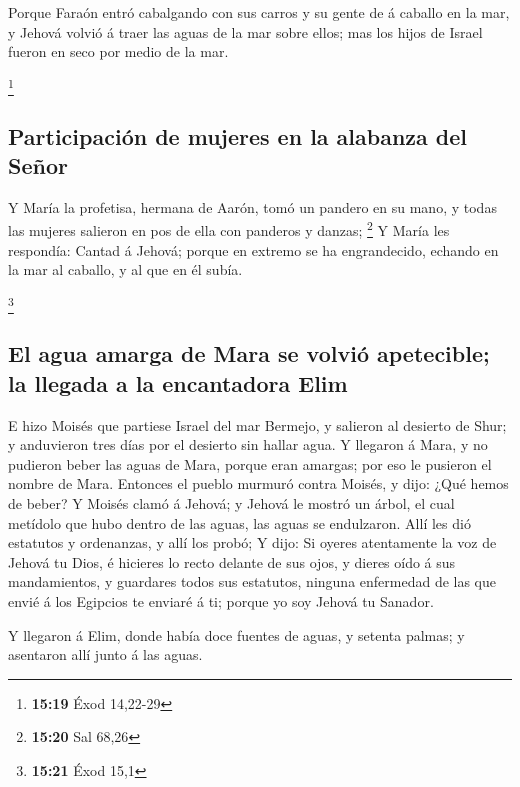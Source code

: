 Porque Faraón entró cabalgando con sus carros y su gente
de á caballo en la mar, y Jehová volvió á traer las aguas de la mar
sobre ellos; mas los hijos de Israel fueron en seco por medio de la mar.

\footnote{\textbf{15:19} Éxod 14,22-29}

\hypertarget{participaciuxf3n-de-mujeres-en-la-alabanza-del-seuxf1or}{%
\subsection{Participación de mujeres en la alabanza del
Señor}\label{participaciuxf3n-de-mujeres-en-la-alabanza-del-seuxf1or}}

 Y María la profetisa, hermana de Aarón, tomó un pandero
en su mano, y todas las mujeres salieron en pos de ella con panderos y
danzas; \footnote{\textbf{15:20} Sal 68,26}  Y María les
respondía: Cantad á Jehová; porque en extremo se ha engrandecido,
echando en la mar al caballo, y al que en él subía.

\footnote{\textbf{15:21} Éxod 15,1}

\hypertarget{el-agua-amarga-de-mara-se-volviuxf3-apetecible-la-llegada-a-la-encantadora-elim}{%
\subsection{El agua amarga de Mara se volvió apetecible; la llegada a la
encantadora
Elim}\label{el-agua-amarga-de-mara-se-volviuxf3-apetecible-la-llegada-a-la-encantadora-elim}}

 E hizo Moisés que partiese Israel del mar Bermejo, y
salieron al desierto de Shur; y anduvieron tres días por el desierto sin
hallar agua.  Y llegaron á Mara, y no pudieron beber las
aguas de Mara, porque eran amargas; por eso le pusieron el nombre de
Mara.  Entonces el pueblo murmuró contra Moisés, y dijo:
¿Qué hemos de beber?  Y Moisés clamó á Jehová; y Jehová
le mostró un árbol, el cual metídolo que hubo dentro de las aguas, las
aguas se endulzaron. Allí les dió estatutos y ordenanzas, y allí los
probó;  Y dijo: Si oyeres atentamente la voz de Jehová tu
Dios, é hicieres lo recto delante de sus ojos, y dieres oído á sus
mandamientos, y guardares todos sus estatutos, ninguna enfermedad de las
que envié á los Egipcios te enviaré á ti; porque yo soy Jehová tu
Sanador.

 Y llegaron á Elim, donde había doce fuentes de aguas, y
setenta palmas; y asentaron allí junto á las aguas.

